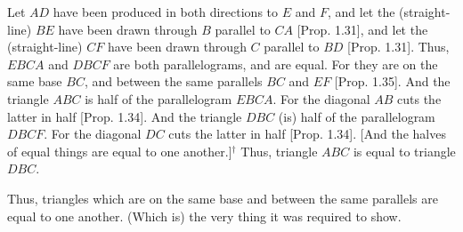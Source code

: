 \begin{Parallel}{}{}
{Let $AD$ have been produced in both directions to $E$ and $F$, and let the
(straight-line) $BE$ have been drawn through $B$ parallel to $CA$ [Prop. 1.31],
and let the (straight-line) $CF$ have been drawn through $C$ parallel to
$BD$ [Prop. 1.31]. Thus, $EBCA$ and $DBCF$ are both parallelograms,
and are equal. For they are on the same base $BC$, and between
the same parallels $BC$ and $EF$ [Prop. 1.35]. And the triangle $ABC$ is
half of 
the parallelogram
$EBCA$. For the diagonal $AB$ cuts the latter in half [Prop. 1.34]. And the 
triangle $DBC$ (is) half of the parallelogram $DBCF$. For the diagonal
$DC$ cuts the latter in half [Prop. 1.34]. [And the halves of equal things are
equal to one another.]$^\dag$
Thus, triangle $ABC$ is equal to triangle $DBC$.

Thus, triangles which are on the same base and between the same parallels
are equal to one another. (Which is) the very thing it was required to show.}
\end{Parallel}


\vspace{7pt}{\footnotesize \noindent$^\dag$ This is an additional common notion.}


